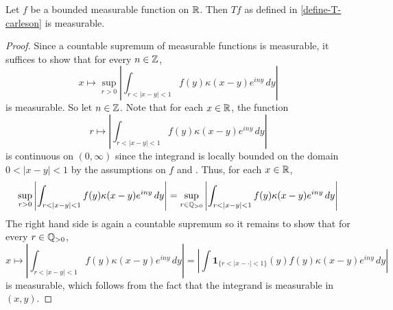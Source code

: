 \begin{lemma}
    \label{real-Carleson-operator-measurable}
    \leanok
    Let $f$ be a bounded measurable function on ${\mathbb{R}}$. Then $Tf$ as defined in \eqref{define-T-carleson} is measurable.
\end{lemma}
\begin{proof}
    \leanok
    Since a countable supremum of measurable functions is measurable, it suffices to show that for every $n\in{\mathbb{Z}}$,
    \begin{equation*}
        x \mapsto \sup_{r>0}\left|\int_{r<|x-y|<1} f(y)\kappa(x-y) e^{iny}\, dy\right|
    \end{equation*}
    is measurable. So let $n\in{\mathbb{Z}}$.
    Note that for each $x\in{\mathbb{R}}$, the function
    \begin{equation*}
        r \mapsto \left|\int_{r<|x-y|<1} f(y)\kappa(x-y) e^{iny}\, dy\right|
    \end{equation*}
    is continuous on $(0,\infty)$ since the integrand is locally bounded on the domain $0<|x-y|<1$ by the assumptions on $f$ and .
    Thus, for each $x\in{\mathbb{R}}$,
    \begin{equation*}
        \sup_{r>0}\left|\int_{r<|x-y|<1} f(y)\kappa(x-y) e^{iny}\, dy\right|
        =\sup_{r\in\Q_{>0}}\left|\int_{r<|x-y|<1} f(y)\kappa(x-y) e^{iny}\, dy\right|
    \end{equation*}
    The right hand side is again a countable supremum so it remains to show that for every $r\in{\mathbb{Q}}_{>0}$,
    \begin{equation*}
        x \mapsto \left|\int_{r<|x-y|<1} f(y)\kappa(x-y) e^{iny}\, dy\right| = \left|\int \mathbf{1}_{\{r<|x-\cdot|<1\}}(y) f(y)\kappa(x-y) e^{iny}\, dy\right|
    \end{equation*}
    is measurable, which follows from the fact that the integrand is measurable in $(x,y)$.
\end{proof}

